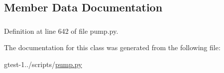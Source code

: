 \subsection{\-Member \-Data \-Documentation}
\hypertarget{classpump_1_1Output_a338951b7e7607b65262fb051e7804d91}{
\subsubsection[{string}]{}}\label{d7/d0c/classpump_1_1Output_a338951b7e7607b65262fb051e7804d91}


\-Definition at line 642 of file pump.\-py.



\-The documentation for this class was generated from the following file\-:\begin{DoxyCompactItemize}
\item 
gtest-\/1../scripts/\hyperlink{pump_8py}{pump.\-py}\end{DoxyCompactItemize}
